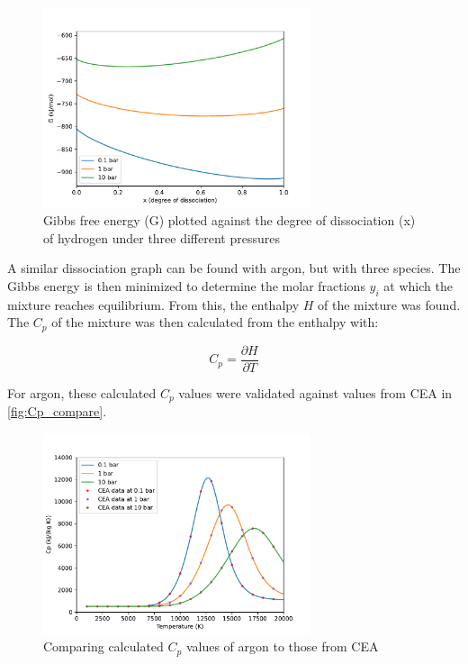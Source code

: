         \begin{figure}[!ht]
            \centering
            \includegraphics[width=0.7\textwidth]{assets/2 models/Gibbs.pdf}
            \caption{Gibbs free energy (G) plotted against the degree of dissociation (x) of hydrogen under three different pressures}
            \label{fig:Gibbs}
        \end{figure}

        A similar dissociation graph can be found with argon, but with three species. The Gibbs energy is then minimized to determine the molar fractions $y_i$ at which the mixture reaches equilibrium. From this, the enthalpy $H$ of the mixture was found. The $C_p$ of the mixture was then calculated from the enthalpy with:

        \begin{equation}
            C_p = \frac{\partial H}{\partial T}
        \end{equation}
        
        For argon, these calculated $C_p$ values were validated against values from CEA \cite{CEARUNRev4} in \autoref{fig:Cp_compare}.
        
        \begin{figure}[!ht]
            \centering
            \includegraphics[width=0.7\textwidth]{assets/2 models/Cp_compare.pdf}
            \caption{Comparing calculated $C_p$ values of argon to those from CEA}
            \label{fig:Cp_compare}
        \end{figure}



